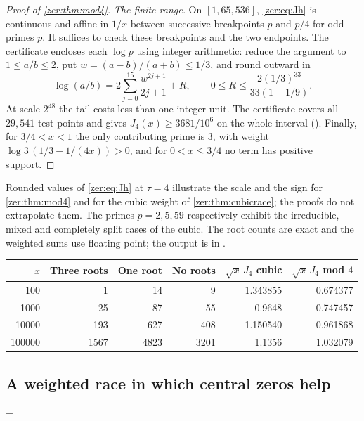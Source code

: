 \begin{proof}[Proof of \cref{zer:thm:mod4}]
\emph{The finite range.} On $[1,65{,}536]$, \eqref{zer:eq:Jh} is continuous and affine in
$1/x$ between successive breakpoints $p$ and $p/4$ for odd primes $p$. It suffices to check
these breakpoints and the two endpoints. The certificate
 encloses each $\log p$ using integer arithmetic:
reduce the argument to $1\le a/b\le2$, put $w=(a-b)/(a+b)\le1/3$, and round
outward in
\[
 \log(a/b)=2\sum_{j=0}^{15}\frac{w^{2j+1}}{2j+1}+R,\qquad
 0\le R\le\frac{2(1/3)^{33}}{33(1-1/9)} .
\]
At scale $2^{48}$ the tail costs less than one integer unit. The certificate covers all
$29{,}541$ test points and gives $J_4(x)\ge3681/10^6$ on the whole interval
(). Finally, for $3/4<x<1$ the only
contributing prime is $3$, with weight $\log3\,(1/3-1/(4x))>0$, and for $0<x\le3/4$ no
term has positive support.
\end{proof}

\begin{remark}\label{zer:rem:samples}
Rounded values of \eqref{zer:eq:Jh} at $\tau=4$ illustrate the scale and the sign for
\cref{zer:thm:mod4} and for the cubic weight of \cref{zer:thm:cubicrace}; the proofs do not
extrapolate them. The primes $p=2,5,59$ respectively exhibit the irreducible, mixed and
completely split cases of the cubic. The root counts are exact and the weighted
sums use floating point; the output is in .
\begin{center}\small
\begin{tabular}{rrrrrr}\toprule
$x$ & Three roots & One root & No roots & $\sqrt x\,J_4$ cubic & $\sqrt x\,J_4$ mod $4$\\\midrule
100&1&14&9&1.343855&0.674377\\
1000&25&87&55&0.9648&0.747457\\
10000&193&627&408&1.150540&0.961868\\
100000&1567&4823&3201&1.1356&1.032079\\\bottomrule
\end{tabular}\end{center}
\end{remark}

\subsection{A weighted race in which central zeros help}\label{hec:ss:central}
{\emergencystretch=\textwidth{}}

